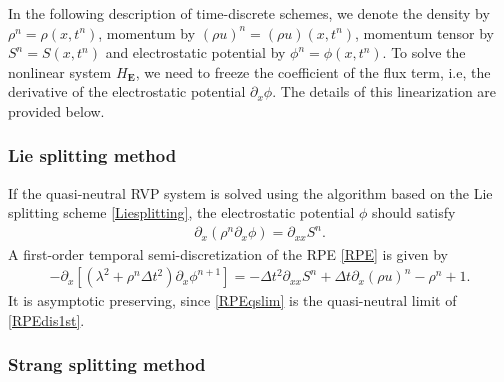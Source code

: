 \documentclass[letterpaper,10pt]{article}
\numberwithin{equation}{section}
\numberwithin{figure}{section}
\numberwithin{table}{section}
\begin{document}
In the following description of time-discrete schemes, we denote the density by $\rho^n=\rho(x,t^n)$, momentum by $(\rho u)^n=(\rho u)(x,t^n)$, momentum tensor by $S^n=S(x,t^n)$ and electrostatic potential by $\phi^n=\phi(x,t^n)$. To solve the nonlinear system $H_{\mathbf{E}}$, we need to freeze the coefficient of the flux term, i.e, the derivative of the electrostatic potential $\partial_x\phi$. The details of this linearization are provided below.

\subsubsection{Lie splitting method}

If the quasi-neutral RVP system is solved using the algorithm based on the
Lie splitting scheme \eqref{Liesplitting}, the
electrostatic potential $\phi$ should satisfy
\cite{Crou2016}
\begin{align}\label{RPEqslim}
    \partial_x \left(\rho^n \partial_x \phi\right)=\partial_{xx}S^n.
\end{align}
A first-order temporal semi-discretization of the RPE \eqref{RPE} is given by
\cite{DEGOND2010,Crou2016}
\begin{align}\label{RPEdis1st}
    -\partial_x\left[\left(\lambda^2+\rho^n \Delta t^2\right) \partial_x \phi^{n+1} \right]=-\Delta t^2 \partial_{x x} S^n+\Delta t\partial_x(\rho u)^n-\rho^n+1.
\end{align}
It is asymptotic preserving, since \eqref{RPEqslim} is the quasi-neutral limit of \eqref{RPEdis1st}.

\subsubsection{Strang splitting method}
\end{document}
